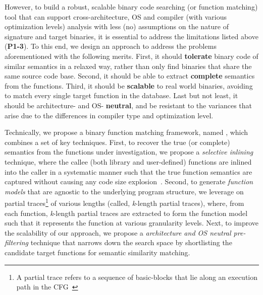 
However, to build a robust, scalable binary code searching (or function matching) tool that can support cross-architecture, OS and compiler (with various optimization levels) analysis with less (no) assumptions on the nature of signature and target binaries, it is essential to address the limitations listed above (\textbf{P1-3}). To this end, we design an approach to address the problems aforementioned with the following merits. First, it should \textbf{tolerate} binary code of similar semantics in a relaxed way, rather than only find binaries that share the same source code base. Second, it should be able to extract \textbf{complete} semantics from the functions. Third, it should be \textbf{scalable} to real world binaries, avoiding to match every single target function in the database. Last but not least, it should be architecture- and OS- \textbf{neutral}, and be resistant to the variances that arise due to the differences in compiler type and optimization level.

Technically, we propose a binary function matching framework, named \tool, which combines a set of key techniques. First, to recover the true (or complete) semantics from the functions under investigation, we propose a \emph{selective inlining} technique, where the callee (both library and user-defined) functions  are inlined into the caller in a systematic manner such that the true function semantics are captured without causing any code size explosion~\cite{wang2015binary}.  Second, to generate \emph{function models} that are agnostic to the underlying program structure, we leverage on partial traces\footnote{A partial trace refers to a sequence of basic-blocks that lie along an execution path in the CFG~\cite{DBLP:conf/pldi/DavidY14}} of various lengths (called, \emph{k}-length partial traces), where, from each function, \emph{k}-length partial traces are extracted to form the function model such that it represents the function at various granularity levels. Next, to improve the scalability of our approach, we propose a \emph{architecture and OS neutral pre-filtering} technique that narrows down the search space by shortlisting the candidate target functions for semantic similarity matching. 


